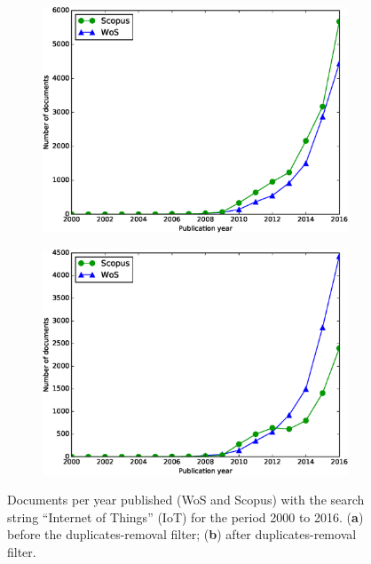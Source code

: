 \documentclass[symmetry,article,accept,moreauthors,pdftex10pt,a4paper]{mdpi}
\begin{document}
\begin{figure}[h]
	\centering
	\begin{subfigure}[b]{0.49\textwidth}
		\includegraphics[width=\textwidth]{./graphs/figure1a.eps}
		\caption{}
		\label{fig_database_org}
	\end{subfigure}
	\begin{subfigure}[b]{0.49\textwidth}
		\includegraphics[width=\textwidth]{./graphs/figure1b.eps}
		\caption{}
		\label{fig_database_filtered}
	\end{subfigure}
	\vspace{-12pt}

	\caption{Documents per year published (WoS and Scopus) with the search string ``Internet of Things'' (IoT) for the period 2000 to 2016. (\textbf{a}) before the duplicates-removal filter; (\textbf{b}) after duplicates-removal filter.}\label{fig_database}
\end{figure}
\end{document}

